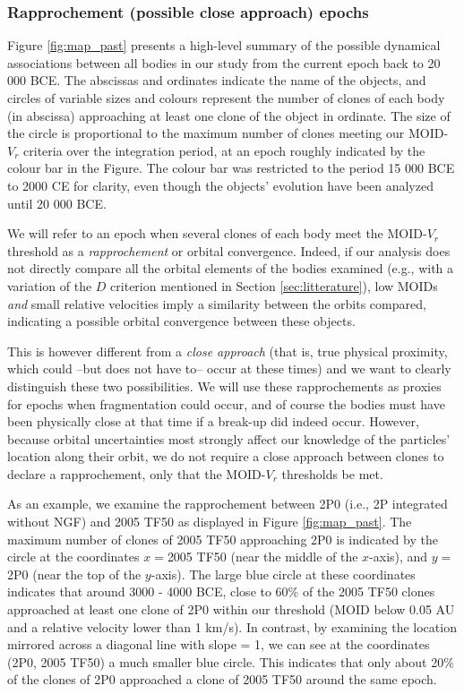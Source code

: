 \documentclass[letters,a4paper,fleqn,usenatbib]{mnras}
\begin{document}
\subsubsection{Rapprochement (possible close approach) epochs} \label{sec:rapprochement_all}

Figure \ref{fig:map_past} presents a high-level summary of the possible dynamical associations between all bodies in our study from the current epoch back to 20 000 BCE. The abscissas and ordinates indicate the name of the objects, and circles of variable sizes and colours represent the number of clones of each body (in abscissa) approaching at least one clone of the object in ordinate. The size of the circle is proportional to the maximum number of clones meeting our MOID-$V_r$ criteria over the integration period, at an epoch roughly indicated by the colour bar in the Figure. The colour bar was restricted to the period 15 000 BCE to 2000 CE for clarity, even though the objects' evolution have been analyzed until 20 000 BCE. 

We will refer to an epoch when several clones of each body meet the MOID-$V_r$ threshold as a {\it rapprochement} or orbital convergence. Indeed, if our analysis does not directly compare all the orbital elements of the bodies examined (e.g., with a variation of the $D$ criterion mentioned in Section \ref{sec:litterature}), low MOIDs {\it and} small relative velocities imply a similarity between the orbits compared, indicating a possible orbital convergence between these objects. 

This is however different from a {\it close approach} (that is, true physical proximity, which  could --but does not have to-- occur at these times) and we want to clearly distinguish these two possibilities. We will use these rapprochements as proxies for epochs when fragmentation could occur, and of course the bodies must have been physically close at that time if a break-up did indeed occur. However, because orbital uncertainties most strongly affect our knowledge of the particles' location along their orbit, we do not require a close approach between clones to declare a rapprochement, only that the MOID-$V_r$ thresholds be met.

As an example, we examine the rapprochement between 2P0 (i.e., 2P integrated without NGF) and 2005 TF50 as displayed in Figure \ref{fig:map_past}. The maximum number of clones of 2005 TF50 approaching 2P0 is indicated by the circle at the coordinates $x=$2005 TF50 (near the middle of the $x$-axis), and $y=$ 2P0 (near the top of the $y$-axis). The large blue circle at these coordinates indicates that around 3000 - 4000 BCE, close to 60\% of the 2005 TF50 clones approached at least one clone of 2P0 within our threshold (MOID below 0.05 AU and a relative velocity lower than 1 km/s). In contrast, by examining the location mirrored across a diagonal line with slope = 1, we can see at the coordinates (2P0, 2005 TF50) a much smaller blue circle. This indicates that only about 20\% of the clones of 2P0 approached a clone of 2005 TF50 around the same epoch. 
\end{document}

